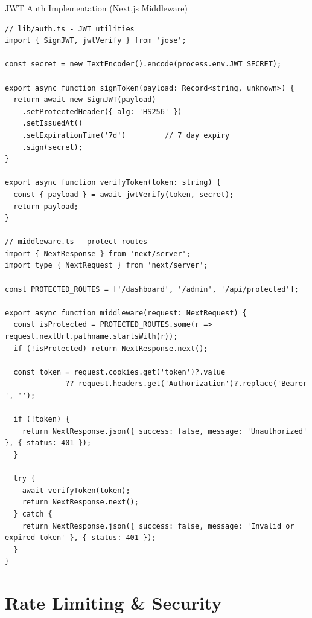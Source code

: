 \documentclass[12pt,a4paper]{article}
\begin{document}
\begin{codebox}{JWT Auth Implementation (Next.js Middleware)}
\begin{lstlisting}
// lib/auth.ts - JWT utilities
import { SignJWT, jwtVerify } from 'jose';

const secret = new TextEncoder().encode(process.env.JWT_SECRET);

export async function signToken(payload: Record<string, unknown>) {
  return await new SignJWT(payload)
    .setProtectedHeader({ alg: 'HS256' })
    .setIssuedAt()
    .setExpirationTime('7d')         // 7 day expiry
    .sign(secret);
}

export async function verifyToken(token: string) {
  const { payload } = await jwtVerify(token, secret);
  return payload;
}

// middleware.ts - protect routes
import { NextResponse } from 'next/server';
import type { NextRequest } from 'next/server';

const PROTECTED_ROUTES = ['/dashboard', '/admin', '/api/protected'];

export async function middleware(request: NextRequest) {
  const isProtected = PROTECTED_ROUTES.some(r => request.nextUrl.pathname.startsWith(r));
  if (!isProtected) return NextResponse.next();

  const token = request.cookies.get('token')?.value
              ?? request.headers.get('Authorization')?.replace('Bearer ', '');

  if (!token) {
    return NextResponse.json({ success: false, message: 'Unauthorized' }, { status: 401 });
  }

  try {
    await verifyToken(token);
    return NextResponse.next();
  } catch {
    return NextResponse.json({ success: false, message: 'Invalid or expired token' }, { status: 401 });
  }
}
\end{lstlisting}
\end{codebox}

\newpage

\section{Rate Limiting \& Security}
\end{document}

